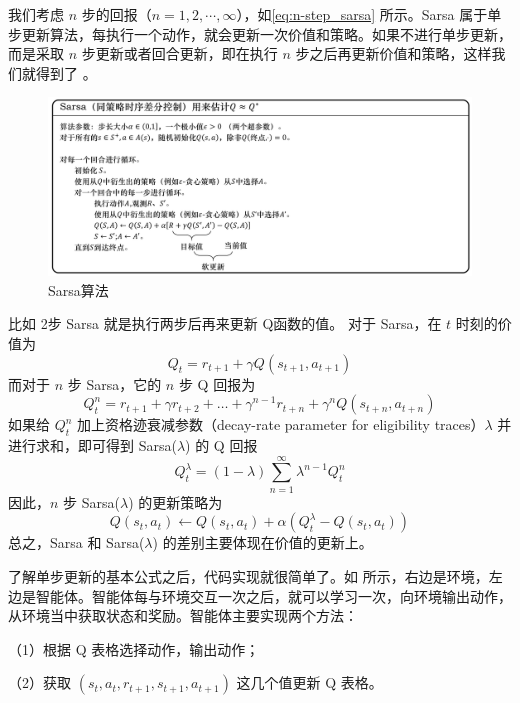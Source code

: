 我们考虑 $n$ 步的回报（$n=1,2,\cdots,\infty$），如\eqref{eq:n-step_sarsa} 所示。Sarsa 属于单步更新算法，每执行一个动作，就会更新一次价值和策略。如果不进行单步更新，而是采取 $n$ 步更新或者回合更新，即在执行 $n$ 步之后再更新价值和策略，这样我们就得到了 。

\begin{figure}[htb]
	\centering
	\includegraphics[width=0.6\linewidth]{res/ch3/3.15}
	\caption{Sarsa算法}
	\label{fig:sarsa_pseudocode}
\end{figure}

比如 2步 Sarsa 就是执行两步后再来更新 Q函数的值。
对于 Sarsa，在 $t$ 时刻的价值为
\begin{equation}
	Q_{t}=r_{t+1}+\gamma Q\left(s_{t+1}, a_{t+1}\right)
	\label{eq:}
\end{equation}
而对于 $n$ 步 Sarsa，它的 $n$ 步 Q 回报为
\begin{equation}
	Q_{t}^{n}=r_{t+1}+\gamma r_{t+2}+\ldots+\gamma^{n-1} r_{t+n}+\gamma^{n} Q\left(s_{t+n}, a_{t+n}\right)
	\label{eq:}
\end{equation}
如果给 $Q_t^{n}$ 加上资格迹衰减参数（decay-rate parameter for eligibility traces）$\lambda$ 并进行求和，即可得到 Sarsa($\lambda$) 的 Q 回报
\begin{equation}
	Q_{t}^{\lambda}=(1-\lambda) \sum_{n=1}^{\infty} \lambda^{n-1} Q_{t}^{n}
	\label{eq:}
\end{equation}
因此，$n$ 步 Sarsa($\lambda$) 的更新策略为
\begin{equation}
	Q\left(s_{t}, a_{t}\right) \leftarrow Q\left(s_{t}, a_{t}\right)+\alpha\left(Q_{t}^{\lambda}-Q\left(s_{t}, a_{t}\right)\right)
	\label{eq:}
\end{equation}
总之，Sarsa 和 Sarsa($\lambda$) 的差别主要体现在价值的更新上。

了解单步更新的基本公式之后，代码实现就很简单了。如 所示，右边是环境，左边是智能体。智能体每与环境交互一次之后，就可以学习一次，向环境输出动作，从环境当中获取状态和奖励。智能体主要实现两个方法：

（1）根据 Q 表格选择动作，输出动作；

（2）获取 $(s_{t}, a_{t}, r_{t+1}, s_{t+1}, a_{t+1})$  这几个值更新 Q 表格。

